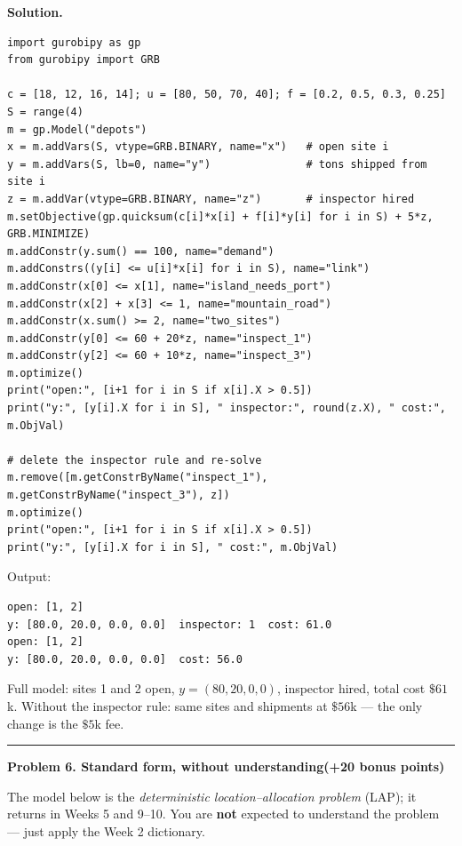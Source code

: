 \documentclass[10pt]{article}
\newcommand{\problem}[2]{%
  \par\bigskip
  {\color{ruleink}\rule{\textwidth}{1pt}}\par\nobreak\vspace{3pt}
  {\large\bfseries #2}\hfill{\normalsize\bfseries(#1 points)}\par\nobreak\vspace{4pt}}
\newenvironment{solution}
  {\par\smallskip\begingroup\color{solink}\textbf{Solution.}\ }
  {\endgroup\par}
\begin{document}
\begin{parts}
\begin{solution}
\begin{lstlisting}
import gurobipy as gp
from gurobipy import GRB

c = [18, 12, 16, 14]; u = [80, 50, 70, 40]; f = [0.2, 0.5, 0.3, 0.25]
S = range(4)
m = gp.Model("depots")
x = m.addVars(S, vtype=GRB.BINARY, name="x")   # open site i
y = m.addVars(S, lb=0, name="y")               # tons shipped from site i
z = m.addVar(vtype=GRB.BINARY, name="z")       # inspector hired
m.setObjective(gp.quicksum(c[i]*x[i] + f[i]*y[i] for i in S) + 5*z, GRB.MINIMIZE)
m.addConstr(y.sum() == 100, name="demand")
m.addConstrs((y[i] <= u[i]*x[i] for i in S), name="link")
m.addConstr(x[0] <= x[1], name="island_needs_port")
m.addConstr(x[2] + x[3] <= 1, name="mountain_road")
m.addConstr(x.sum() >= 2, name="two_sites")
m.addConstr(y[0] <= 60 + 20*z, name="inspect_1")
m.addConstr(y[2] <= 60 + 10*z, name="inspect_3")
m.optimize()
print("open:", [i+1 for i in S if x[i].X > 0.5])
print("y:", [y[i].X for i in S], " inspector:", round(z.X), " cost:", m.ObjVal)

# delete the inspector rule and re-solve
m.remove([m.getConstrByName("inspect_1"), m.getConstrByName("inspect_3"), z])
m.optimize()
print("open:", [i+1 for i in S if x[i].X > 0.5])
print("y:", [y[i].X for i in S], " cost:", m.ObjVal)
\end{lstlisting}
Output:
\begin{lstlisting}
open: [1, 2]
y: [80.0, 20.0, 0.0, 0.0]  inspector: 1  cost: 61.0
open: [1, 2]
y: [80.0, 20.0, 0.0, 0.0]  cost: 56.0
\end{lstlisting}
Full model: sites 1 and 2 open, $y = (80, 20, 0, 0)$, inspector hired, total
cost $\$61$k. Without the inspector rule: same sites and shipments at $\$56$k ---
the only change is the $\$5$k fee.
\end{solution}
\end{parts}

\problem{+20 bonus}{Problem 6. Standard form, without understanding}

The model below is the \emph{deterministic location--allocation problem} (LAP); it
returns in Weeks 5 and 9--10. You are \textbf{not} expected to understand the
problem --- just apply the Week 2 dictionary.
\end{document}
